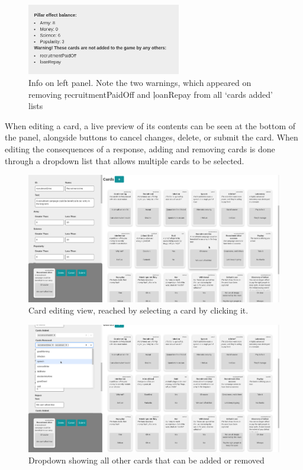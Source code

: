 \begin{figure}[!h]
	\centering
	\includegraphics[width=0.6\textwidth]{./images/design/info.png}
	\caption{Info on left panel. Note the two warnings, which appeared on removing \c{recruitmentPaidOff} and \c{loanRepay} from all `cards added' lists}
	\label{fig:info}
\end{figure}

When editing a card, a live preview of its contents can be seen at the bottom of the panel, alongside buttons to cancel changes, delete, or submit the card. When editing the consequences of a response, adding and removing cards is done through a dropdown list that allows multiple cards to be selected.

\begin{figure}[!h]
	\centering
	\includegraphics[width=1.0\textwidth]{./images/design/card_edit.png}
	\caption{Card editing view, reached by selecting a card by clicking it.}
	\label{fig:card_edit}
\end{figure}

\begin{figure}[!h]
	\centering
	\includegraphics[width=1.0\textwidth]{./images/design/add_card.png}
	\caption{Dropdown showing all other cards that can be added or removed}
	\label{fig:add_card}
\end{figure}

